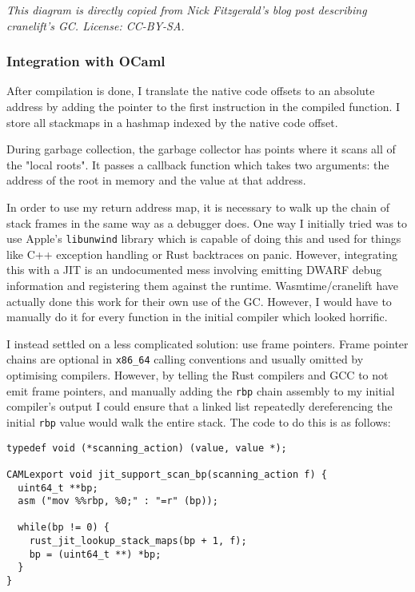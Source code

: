 \emph{This diagram is directly copied from Nick Fitzgerald's blog post \cite{refblog} describing
      cranelift's GC. License: CC-BY-SA.}

\subsubsection{Integration with OCaml}

After compilation is done, I translate the native code offsets to an absolute address by adding the
pointer to the first instruction in the compiled function. I store all stackmaps in a hashmap
indexed by the native code offset.

During garbage collection, the garbage collector has points where it scans all of the "local
roots". It passes a callback function which takes two arguments: the address of the root in memory
and the value at that address.

In order to use my return address map, it is necessary to walk up the chain of stack frames in the
same way as a debugger does.  One way I initially tried was to use Apple's \texttt{libunwind}
library which is capable of doing this and used for things like C++ exception handling or Rust
backtraces on panic. However, integrating this with a JIT is an undocumented mess involving
emitting DWARF debug information and registering them against the runtime. Wasmtime/cranelift have
actually done this work for their own use of the GC. However, I would have to manually do it for
every function in the initial compiler which looked horrific.

I instead settled on a less complicated solution: use frame pointers. Frame pointer chains are
optional in \texttt{x86\_64} calling conventions and usually omitted by optimising compilers.
However, by telling the Rust compilers and GCC to not emit frame pointers, and manually adding the
\texttt{rbp} chain assembly to my initial compiler's output I could ensure that a linked list
repeatedly dereferencing the initial \texttt{rbp} value would walk the entire stack. The code to do
this is as follows:

\begin{verbatim}
typedef void (*scanning_action) (value, value *);

CAMLexport void jit_support_scan_bp(scanning_action f) {
  uint64_t **bp;
  asm ("mov %%rbp, %0;" : "=r" (bp));

  while(bp != 0) {
    rust_jit_lookup_stack_maps(bp + 1, f);
    bp = (uint64_t **) *bp;
  }
}
\end{verbatim}

